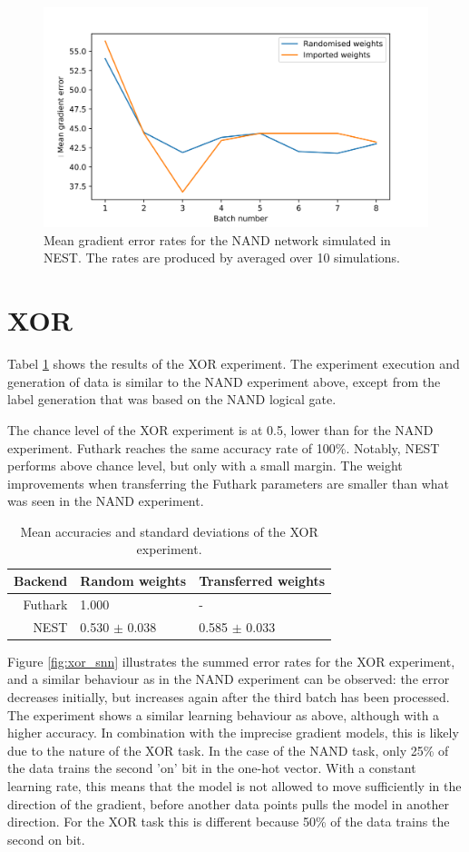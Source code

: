 \documentclass[report.tex]{subfiles}
\begin{document}
\begin{figure}
  \includegraphics[width=\linewidth]{images/nand.png}
  \caption{Mean gradient error rates for the NAND network simulated in NEST. The rates
  are produced by averaged over 10 simulations.}
  \label{fig:nand_snn_error}
\end{figure}
\FloatBarrier

\section{XOR}
Tabel \ref{tab:xor} shows the results of the XOR experiment.
The experiment execution and generation of data is similar to the NAND
experiment above, except from the label generation that was based on the NAND
logical gate.

The chance level of the XOR experiment is at 0.5, lower than for the NAND
experiment.
Futhark reaches the same accuracy rate of 100\%.
Notably, NEST performs above chance level, but only with a small margin. The 
weight improvements when transferring the Futhark parameters are smaller than 
what was seen in the NAND experiment.

\begin{table}
  \begin{tabular}{r l l}
  Backend & Random weights & Transferred weights \\ \hline
  Futhark & 1.000 & - \\ 
  NEST & 0.530 $\pm$ 0.038 & 0.585 $\pm$ 0.033 \\
  \end{tabular}
  \caption{Mean accuracies and standard deviations of the XOR experiment.}
  \label{tab:xor}
\end{table}

Figure \ref{fig:xor_snn} illustrates the summed error rates for the XOR
experiment, and a similar behaviour as in the NAND experiment can be observed:
the error decreases initially, but increases again after the third batch has
been processed.
The experiment shows a similar learning behaviour as above, although with a
higher accuracy.
In combination with the imprecise gradient models, this is likely due to the
nature of the XOR task.
In the case of the NAND task, only 25\% of the data trains the second 'on' bit
in the one-hot vector. 
With a constant learning rate, this means that the model is not allowed to move
sufficiently in the direction of the gradient, before another data points pulls
the model in another direction. 
For the XOR task this is different because 50\% of the data trains the second on
bit.
\end{document}
